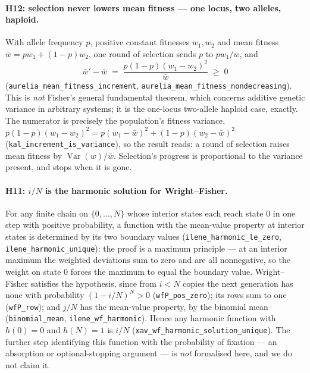 \documentclass[11pt,a4paper]{article}
\theoremstyle{definition}
\theoremstyle{remark}
\begin{document}
\paragraph{H12: selection never lowers mean fitness --- one locus, two alleles,
haploid.} With allele frequency $p$, positive constant fitnesses $w_1, w_2$ and
mean fitness $\bar w = p w_1 + (1-p)w_2$, one round of selection sends $p$ to
$p w_1/\bar w$, and
\[
  \bar w' - \bar w \;=\; \frac{p(1-p)(w_1-w_2)^2}{\bar w} \;\ge\; 0
\]
(\texttt{aurelia\_mean\_fitness\_increment},
\texttt{aurelia\_mean\_fitness\_nondecreasing}). This is \emph{not} Fisher's
general fundamental theorem, which concerns additive genetic variance in
arbitrary systems; it is the one-locus two-allele haploid case, exactly. The
numerator is precisely the population's fitness variance,
$p(1-p)(w_1-w_2)^2 = p(w_1-\bar w)^2 + (1-p)(w_2-\bar w)^2$
(\texttt{kal\_increment\_is\_variance}), so the result reads: a round of selection
raises mean fitness by $\operatorname{Var}(w)/\bar w$. Selection's progress is
proportional to the variance present, and stops when it is gone.

\paragraph{H11: $i/N$ is the harmonic solution for Wright--Fisher.} For any
finite chain on $\{0,\dots,N\}$ whose interior states each reach state $0$ in one
step with positive probability, a function with the mean-value property at
interior states is determined by its two boundary values
(\texttt{ilene\_harmonic\_le\_zero}, \texttt{ilene\_harmonic\_unique}): the proof
is a maximum principle --- at an interior maximum the weighted deviations sum to
zero and are all nonnegative, so the weight on state $0$ forces the maximum to
equal the boundary value. Wright--Fisher satisfies the hypothesis, since from
$i<N$ copies the next generation has none with probability $(1-i/N)^N>0$
(\texttt{wfP\_pos\_zero}); its rows sum to one (\texttt{wfP\_row}); and $j/N$ has
the mean-value property, by the binomial mean (\texttt{binomial\_mean},
\texttt{ilene\_wf\_harmonic}). Hence any harmonic function with $h(0)=0$ and
$h(N)=1$ is $i/N$ (\texttt{xav\_wf\_harmonic\_solution\_unique}). The further
step identifying this function with the probability of fixation --- an
absorption or optional-stopping argument --- is \emph{not} formalised here, and
we do not claim it.
\end{document}
